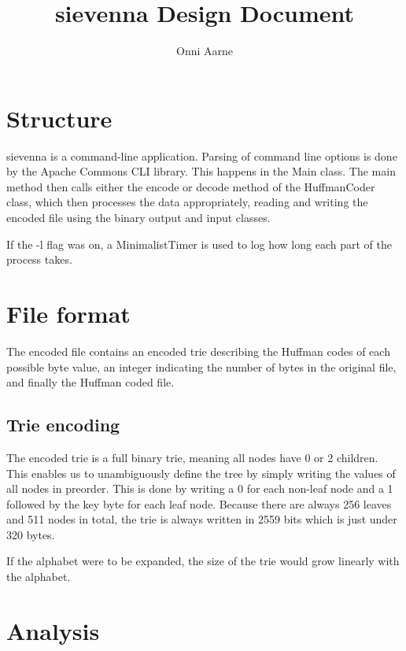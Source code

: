 \documentclass[11pt,a4paper,oneside,notitlepage,final]{article}
\begin{document}
	
	\setlength{\abovedisplayskip}{8.0pt plus3.0pt minus4.0pt}
	\setlength{\abovedisplayshortskip}{0.0pt plus3.0pt}
	\setlength{\belowdisplayskip}{8.0pt plus3.0pt minus4.0pt}
	\setlength{\belowdisplayshortskip}{7.0pt plus3.0pt minus3.0pt}
	
	\title{sievenna Design Document}
	\author{Onni Aarne}
	\maketitle
	
	\section{Structure}
	
	sievenna is a command-line application. Parsing of command line options is done by the Apache Commons CLI library. This happens in the Main class. The main method then calls either the encode or decode method of the HuffmanCoder class, which then processes the data appropriately, reading and writing the encoded file using the binary output and input classes.
	
	If the -l flag was on, a MinimalistTimer is used to log how long each part of the process takes.
	
	\section{File format}
	
	The encoded file contains an encoded trie describing the Huffman codes of each possible byte value, an integer indicating the number of bytes in the original file, and finally the Huffman coded file.
	
	\subsection{Trie encoding}
	The encoded trie is a full binary trie, meaning all nodes have 0 or 2 children. This enables us to unambiguously define the tree by simply writing the values of all nodes in preorder. This is done by writing a 0 for each non-leaf node and a 1 followed by the key byte for each leaf node. Because there are always 256 leaves and 511 nodes in total, the trie is always written in 2559 bits which is just under 320 bytes.
	
	If the alphabet were to be expanded, the size of the trie would grow linearly with the alphabet.
	
	\section{Analysis}
\end{document}
